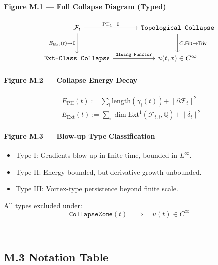 \documentclass[11pt]{article}
\begin{document}
\paragraph{Figure M.1 — Full Collapse Diagram (Typed)}

\[
\begin{tikzcd}[row sep=large, column sep=large]
\mathcal{F}_t
  \arrow[r, "{\mathrm{PH}_1 = 0}"]
  \arrow[d, "{E_{\mathrm{Ext}}(t) \to 0}"']
& \texttt{Topological Collapse}
  \arrow[d, "{C : \mathsf{Filt} \to \mathsf{Triv}}"] \\
\texttt{Ext-Class Collapse}
  \arrow[r, "{\texttt{Gluing Functor}}"]
& u(t,x) \in C^\infty
\end{tikzcd}
\]


\paragraph{Figure M.2 — Collapse Energy Decay}

\[
\begin{aligned}
& E_{\mathrm{PH}}(t) := \sum_i \mathrm{length}(\gamma_i(t)) + \|\partial \mathcal{F}_t\|^2 \\
& E_{\mathrm{Ext}}(t) := \sum_i \dim \mathrm{Ext}^1(\mathcal{F}_{t,i}, \mathbb{Q}) + \|\delta_t\|^2
\end{aligned}
\]

\paragraph{Figure M.3 — Blow-up Type Classification}

\begin{itemize}
  \item Type I: Gradients blow up in finite time, bounded in \( L^\infty \).
  \item Type II: Energy bounded, but derivative growth unbounded.
  \item Type III: Vortex-type persistence beyond finite scale.
\end{itemize}

All types excluded under:
\[
\texttt{CollapseZone}(t) \quad \Rightarrow \quad u(t) \in C^\infty
\]

---

\subsection*{M.3 Notation Table}
\end{document}
